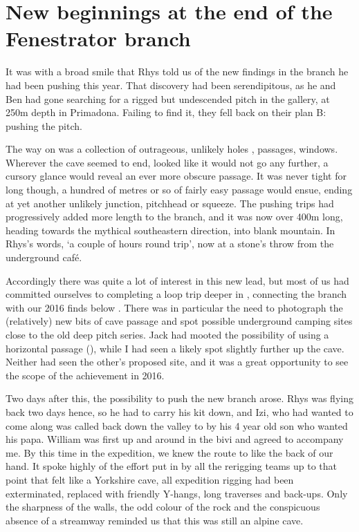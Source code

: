 \section{New beginnings at the end of the Fenestrator branch}

It was with a broad smile that Rhys told us of the new findings in the  branch he had been pushing this year. That discovery had been serendipitous, as he and Ben had gone searching for a rigged but undescended pitch in the  gallery, at 250m depth in \passage[cave]Primadona. Failing to find it, they fell back on their plan B: pushing the  pitch.

The way on was a collection of  outrageous, unlikely holes , passages, windows. Wherever the cave seemed to end, looked like it would not go any further, a cursory glance would reveal an ever more obscure passage. It was never tight for long though, a hundred of metres or so of fairly easy passage would ensue, ending at yet another unlikely junction, pitchhead or squeeze. The pushing trips had progressively added more length to the branch, and it was now over 400m long, heading towards the mythical southeastern direction, into blank mountain. In Rhys’s words, ‘a couple of hours round trip’, now at a stone’s throw from the underground café. 

Accordingly there was quite a lot of interest in this new lead, but most of us had committed ourselves to completing a loop trip  deeper in , connecting the  branch with our 2016 finds below . There was in particular the need to photograph the (relatively) new bits of cave passage and spot possible underground camping sites close to the old deep pitch series. Jack had mooted the possibility of using a horizontal passage (), while I had seen a likely spot slightly further up the cave. Neither had seen the other’s proposed site, and it was a great opportunity to see the scope of the achievement in 2016. 

Two days after this, the possibility to push the new branch arose.  Rhys was flying back two days hence, so he had to carry his kit down, and Izi, who had wanted to come along was called back down the valley to  by his 4 year old son who wanted his papa. William was first up and around in the bivi and agreed to accompany me. By this time in the expedition, we knew the route to  like the back of our hand. It spoke highly of the effort put in by all the rerigging teams up to that point that  felt like a Yorkshire cave, all expedition rigging had been exterminated, replaced with friendly Y-hangs, long traverses and back-ups.  Only the sharpness of the walls, the odd colour of the rock and the conspicuous absence of a streamway reminded us that this was still an alpine cave.

